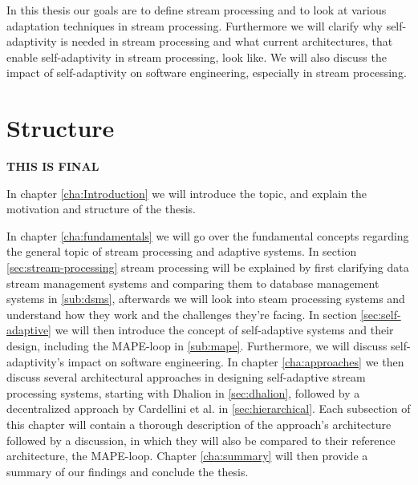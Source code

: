 \quad In this thesis our goals are to define stream processing and to look at various adaptation techniques in stream processing. Furthermore we will clarify why
self-adaptivity is needed in stream processing and what current architectures, that enable self-adaptivity in stream processing, look like.
We will also discuss the impact of self-adaptivity on software engineering, especially in stream processing.


\section{Structure}
\label{sec:structure}
\textbf{\color{green}THIS IS FINAL}

In chapter \ref{cha:Introduction} we will introduce the topic, and explain the motivation and structure of the thesis.

In chapter \ref{cha:fundamentals} we will go over the fundamental concepts regarding the general topic of stream processing and adaptive systems.
In section \ref{sec:stream-processing} stream processing will be explained by first clarifying data stream management systems and comparing them to database management systems 
in \ref{sub:dsms}, afterwards we will look into steam processing systems and understand how they work and the challenges they're facing.
In section \ref{sec:self-adaptive} we will then introduce the concept of self-adaptive systems and their design, including the MAPE-loop in \ref{sub:mape}. 
Furthermore, we will discuss self-adaptivity's impact on software engineering.
In chapter \ref{cha:approaches} we then discuss several architectural approaches in designing self-adaptive stream processing systems, starting with Dhalion in \ref{sec:dhalion}, 
followed by a decentralized approach by Cardellini et al. in \ref{sec:hierarchical}.
Each subsection of this chapter will contain a thorough description of the approach's architecture followed by a discussion, 
in which they will also be compared to their reference architecture, the MAPE-loop.
Chapter \ref{cha:summary} will then provide a summary of our findings and conclude the thesis.
